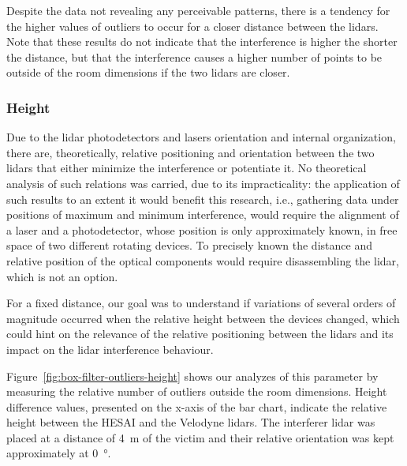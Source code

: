 Despite the data not revealing any perceivable patterns, there is a tendency for the higher values of outliers to occur for a closer distance between the \acp{lidar}. Note that these results do not indicate that the interference is higher the shorter the distance, but that the interference causes a higher number of points to be outside of the room dimensions if the two \acp{lidar} are closer. 

\subsubsection{Height}
Due to the \ac{lidar} photodetectors and lasers orientation and internal organization, there are, theoretically, relative positioning and orientation between the two \acp{lidar} that either minimize the interference or potentiate it. No theoretical analysis of such relations was carried, due to its impracticality: the application of such results to an extent it would benefit this research, i.e., gathering data under positions of maximum and minimum interference, would require the alignment of a laser and a photodetector, whose position is only approximately known, in free space of two different rotating devices. To precisely known the distance and relative position of the optical components would require disassembling the \ac{lidar}, which is not an option.

For a fixed distance, our goal was to understand if variations of several orders of magnitude occurred when the relative height between the devices changed, which could hint on the relevance of the relative positioning between the \acp{lidar} and its impact on the \ac{lidar} interference behaviour.

Figure~\ref{fig:box-filter-outliers-height} shows our analyzes of this parameter by measuring the relative number of outliers outside the room dimensions. Height difference values, presented on the x-axis of the bar chart, indicate the relative height between the HESAI and the Velodyne \acp{lidar}. The interferer \ac{lidar} was placed at a distance of \SI{4}{\meter} of the victim and their relative orientation was kept approximately at \SI{0}{\degree}.

